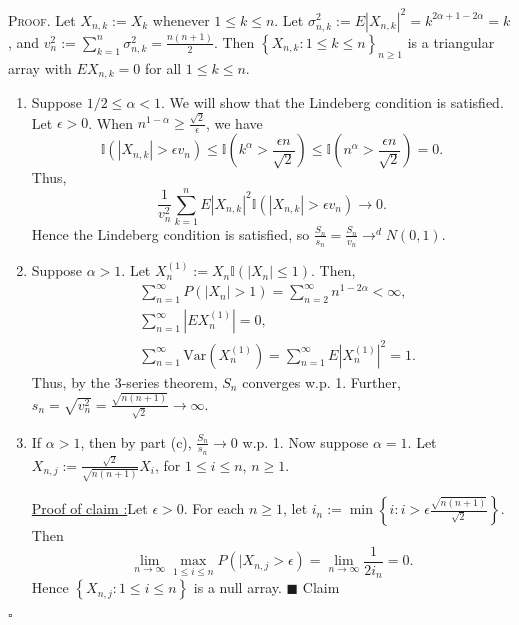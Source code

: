 \documentclass[12pt]{article}
\newcounter{ProofCounter}
\newcounter{ClaimCounter}[ProofCounter]
\newenvironment{Proof}{\stepcounter{ProofCounter}\textsc{Proof.}}{\hfill$\square$}
\newenvironment{claim}[1]{\vspace{1mm}\stepcounter{ClaimCounter}\par\noindent\underline{\bf Claim \theClaimCounter:}\space#1}{}
\newenvironment{claimproof}[1]{\par\noindent\underline{Proof of claim \theClaimCounter:}\space#1}{\hfill $\blacksquare$ Claim \theClaimCounter}
\begin{document}
\begin{Proof}
  Let $X_{n,k} := X_{k}$ whenever $1 \leq k \leq n$. Let $\sigma_{n,k}^{2} := E|X_{n,k}|^{2} = k^{2\alpha + 1 - 2\alpha} = k$, and $v_{n}^{2} :=
  \sum_{k=1}^{n}\sigma_{n,k}^{2} = \frac{n(n+1)}{2}$. Then $\left\{ X_{n,k} : 1 \leq k \leq n \right\}_{n\geq 1}$ is a triangular array with $EX_{n,k}
  = 0$ for all $1 \leq k \leq n$.
  \begin{enumerate}[label = (\alph*)]
    \item Suppose $1/2 \leq \alpha < 1$. We will show that the Lindeberg condition is satisfied. Let $\epsilon > 0$. When $n^{1 - \alpha} \geq
      \frac{\sqrt{2}}{\epsilon}$, we have 
      \[ 
        \mathbb{I}(|X_{n,k}| > \epsilon v_{n}) \leq \mathbb{I}\left(k^{\alpha} > \frac{\epsilon n}{\sqrt{2}}\right) \leq \mathbb{I}\left(n^{\alpha} >
        \frac{\epsilon n}{\sqrt{2}}\right) = 0.
      \]
      Thus,
      \[ \frac{1}{v_{n}^{2}}\sum_{k=1}^{n}E|X_{n,k}|^{2}\mathbb{I}(|X_{n,k}| > \epsilon v_{n}) \rightarrow 0. \]
      Hence the Lindeberg condition is satisfied, so $\frac{S_{n}}{s_{n}} = \frac{S_{n}}{v_{n}} \rightarrow^{d} N(0,1)$.\addtocounter{enumi}{1} 
    \item Suppose $\alpha > 1$. Let $X_{n}^{(1)} := X_{n}\mathbb{I}(|X_{n}| \leq 1)$. Then,
      \begin{align*}
        & \sum_{n=1}^{\infty}P(|X_{n}| > 1) = \sum_{n=2}^{\infty}n^{1-2\alpha} < \infty, \\
        & \sum_{n=1}^{\infty}|EX_{n}^{(1)}| = 0, \\
        & \sum_{n=1}^{\infty}\text{Var}(X_{n}^{(1)}) = \sum_{n=1}^{\infty}E|X_{n}^{(1)}|^{2} = 1.
      \end{align*}
      Thus, by the 3-series theorem, $S_{n}$ converges w.p. 1. Further, $s_{n} = \sqrt{v_{n}^{2}} = \frac{\sqrt{n(n+1)}}{\sqrt{2}} \rightarrow
      \infty$. \addtocounter{enumi}{-2}
      \newpage
    \item If $\alpha > 1$, then by part (c), $\frac{S_{n}}{s_{n}} \rightarrow 0$ w.p. 1. Now suppose $\alpha = 1$. Let $X_{n,j} :=
      \frac{\sqrt{2}}{\sqrt{n(n+1)}}X_{i}$, for $1 \leq i \leq n$, $n \geq 1$.
        \begin{claimproof}
          Let $\epsilon > 0$. For each $n \geq 1$, let $i_{n} := \min\left\{i : i > \epsilon \frac{\sqrt{n(n+1)}}{\sqrt{2}}\right\}$. Then
          \[ \lim_{n\rightarrow\infty}\max_{1\leq i \leq n}P(|X_{n,j} > \epsilon) = \lim_{n\rightarrow\infty}\frac{1}{2i_{n}} = 0. \]
          Hence $\left\{ X_{n,j} : 1 \leq i\leq n \right\}$ is a null array.
        \end{claimproof}


\end{enumerate}
\end{Proof}
\end{document}
